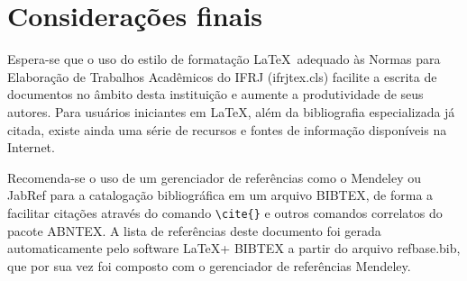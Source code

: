%
%

\chapter{Considerações finais}
\label{chap:Considerações finais}


Espera-se que o uso do estilo de formatação \LaTeX\, adequado às Normas para Elaboração de Trabalhos Acadêmicos do IFRJ ({\ttfamily ifrjtex.cls}) facilite a escrita de documentos no âmbito desta instituição e aumente a produtividade de seus autores. Para usuários iniciantes em \LaTeX, além da bibliografia especializada já citada, existe ainda uma série de recursos \cite{CTAN2009} e fontes de informação \cite{TeX-Br2009,Wikibooks2009} disponíveis na Internet.

Recomenda-se o uso de um gerenciador de referências como o Mendeley \cite{Mendeley2009} ou JabRef \cite{JabRef2009}  para a catalogação bibliográfica em um arquivo BIBTEX, de forma a facilitar citações através do comando \verb#\cite{}# e outros comandos correlatos do pacote ABNTEX. A lista de referências deste documento foi gerada automaticamente pelo software \LaTeX + BIBTEX a partir do arquivo {\ttfamily refbase.bib}, que por sua vez foi composto com o gerenciador de referências Mendeley.
